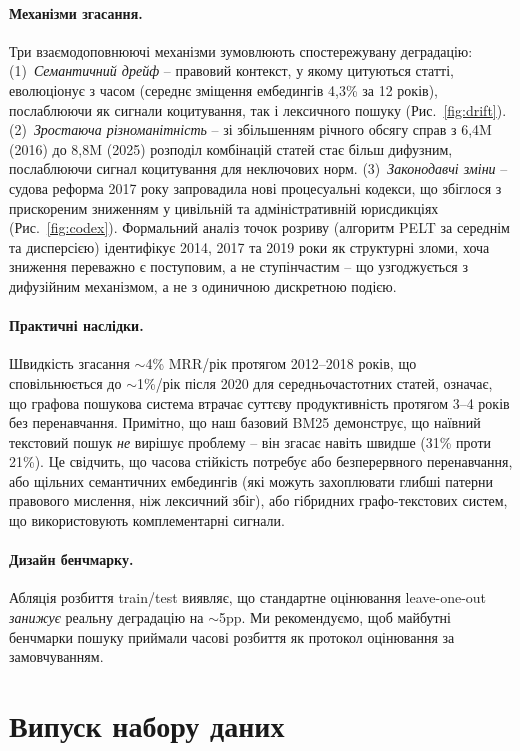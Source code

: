 \documentclass[11pt]{article}
\begin{document}
\paragraph{Механізми згасання.}
Три взаємодоповнюючі механізми зумовлюють спостережувану деградацію:
(1)~\emph{Семантичний дрейф} -- правовий контекст, у якому цитуються статті, еволюціонує з часом (середнє зміщення ембедингів 4{,}3\% за 12 років), послаблюючи як сигнали коцитування, так і лексичного пошуку (Рис.~\ref{fig:drift}).
(2)~\emph{Зростаюча різноманітність} -- зі збільшенням річного обсягу справ з 6{,}4M (2016) до 8{,}8M (2025) розподіл комбінацій статей стає більш дифузним, послаблюючи сигнал коцитування для неключових норм.
(3)~\emph{Законодавчі зміни} -- судова реформа 2017 року запровадила нові процесуальні кодекси, що збіглося з прискореним зниженням у цивільній та адміністративній юрисдикціях (Рис.~\ref{fig:codex}).
Формальний аналіз точок розриву (алгоритм PELT за середнім та дисперсією) ідентифікує 2014, 2017 та 2019 роки як структурні зломи, хоча зниження переважно є поступовим, а не ступінчастим -- що узгоджується з дифузійним механізмом, а не з одиничною дискретною подією.

\paragraph{Практичні наслідки.}
Швидкість згасання $\sim$4\% MRR/рік протягом 2012--2018 років, що сповільнюється до $\sim$1\%/рік після 2020 для середньочастотних статей, означає, що графова пошукова система втрачає суттєву продуктивність протягом 3--4 років без перенавчання.
Примітно, що наш базовий BM25 демонструє, що наївний текстовий пошук \emph{не} вирішує проблему -- він згасає навіть швидше (31\% проти 21\%).
Це свідчить, що часова стійкість потребує або безперервного перенавчання, або щільних семантичних ембедингів (які можуть захоплювати глибші патерни правового мислення, ніж лексичний збіг), або гібридних графо-текстових систем, що використовують комплементарні сигнали.

\paragraph{Дизайн бенчмарку.}
Абляція розбиття train/test виявляє, що стандартне оцінювання leave-one-out \emph{занижує} реальну деградацію на $\sim$5pp.
Ми рекомендуємо, щоб майбутні бенчмарки пошуку приймали часові розбиття як протокол оцінювання за замовчуванням.

\section{Випуск набору даних}
\label{sec:release}
\end{document}
